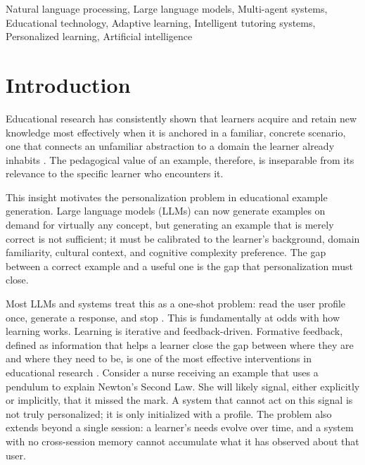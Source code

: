 \documentclass[conference]{IEEEtran}
\begin{document}
\begin{abstract}
\end{abstract}

\begin{IEEEkeywords}
Natural language processing, Large language models, Multi-agent systems, Educational technology, Adaptive learning, Intelligent tutoring systems, Personalized learning, Artificial intelligence
\end{IEEEkeywords}


\section{Introduction}

Educational research has consistently shown that learners acquire and retain new knowledge most effectively when it is anchored in a familiar, concrete scenario, one that connects an unfamiliar abstraction to a domain the learner already inhabits \cite{b6}. The pedagogical value of an example, therefore, is inseparable from its relevance to the specific learner who encounters it.

This insight motivates the personalization problem in educational example generation. Large language models (LLMs) can now generate examples on demand for virtually any concept, but generating an example that is merely correct is not sufficient; it must be calibrated to the learner's background, domain familiarity, cultural context, and cognitive complexity preference. The gap between a correct example and a useful one is the gap that personalization must close.

Most LLMs and systems treat this as a one-shot problem: read the user profile once, generate a response, and stop \cite{b1, b2}. This is fundamentally at odds with how learning works. Learning is iterative and feedback-driven. Formative feedback, defined as information that helps a learner close the gap between where they are and where they need to be, is one of the most effective interventions in educational research \cite{b7}. Consider a nurse receiving an example that uses a pendulum to explain Newton's Second Law. She will likely signal, either explicitly or implicitly, that it missed the mark. A system that cannot act on this signal is not truly personalized; it is only initialized with a profile. The problem also extends beyond a single session: a learner's needs evolve over time, and a system with no cross-session memory cannot accumulate what it has observed about that user.
\end{document}

